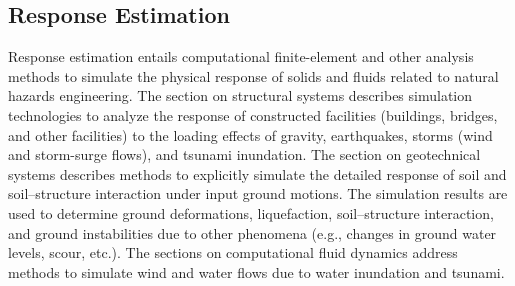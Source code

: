 
\begin{partbacktext}
\part{Response Estimation}
\label{part:response}

Response estimation entails computational finite-element and other analysis methods to simulate the physical response of solids and fluids related to natural hazards engineering. The section on structural systems describes simulation technologies to analyze the response of constructed facilities (buildings, bridges, and other facilities) to the loading effects of gravity, earthquakes, storms (wind and storm-surge flows), and tsunami inundation. The section on geotechnical systems describes methods to explicitly simulate the detailed response of soil and soil–structure interaction under input ground motions. The simulation results are used to determine ground deformations, liquefaction, soil–structure interaction, and ground instabilities due to other phenomena (e.g., changes in ground water levels, scour, etc.). The sections on computational fluid dynamics address methods to simulate wind and water flows due to water inundation and tsunami. 

\end{partbacktext}